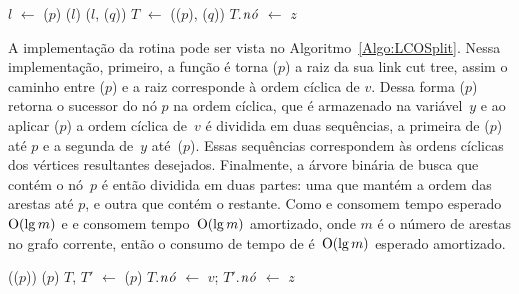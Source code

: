 \begin{algorithm}[htb]
\caption{\LCOMerge($p$, $q$, $z$)}
\label{Algo:LCOMerge}
\begin{algorithmic}[1]
\State $l$ $\gets$ \treapLast($p$)
\State \linkcutEvert($l$)
\State \linkcutAddEdge($l$, \treapFirst($q$))
\State $T$ $\gets$ \treapJoin(\treapGetRoot($p$), \treapGetRoot($q$))
\State $T$.$\mathit{n\acute{o}}$ $\gets$ $z$
\end{algorithmic}
\end{algorithm}

A implementação da rotina \LCOSplit{} pode ser vista no Algoritmo~\ref{Algo:LCOSplit}.
Nessa implementação, primeiro, a função \linkcutEvert{} é torna \treapLast($p$) a raiz da sua link cut tree, assim o caminho entre \treapFirst($p$) e a raiz corresponde à ordem cíclica de $v$.
Dessa forma \linkcutParent($p$) retorna o sucessor do nó $p$ na ordem cíclica, que é armazenado na variável~$y$ e ao aplicar \linkcutDelEdge($p$) a ordem cíclica de~$v$ é dividida em duas sequências, a primeira de \treapFirst($p$) até $p$ e a segunda de~$y$ até~\treapLast($p$).
Essas sequências correspondem às ordens cíclicas dos vértices resultantes desejados.
Finalmente, a árvore binária de busca que contém o nó~$p$ é então dividida em duas partes: uma que mantém a ordem das arestas até $p$, e outra que contém o restante.
Como \treapLast{} e \treapSplitRight{} consomem tempo esperado~$\mathrm{O}(\lg m)$ e \linkcutEvert{} e \linkcutDelEdge{} consomem tempo~$\mathrm{O}(\lg m)$ amortizado, onde $m$ é o número de arestas no grafo corrente, então o consumo de tempo de \LCOSplit{} é~$\mathrm{O}(\lg m)$ esperado amortizado.

\begin{algorithm}[htb]
\caption{\LCOSplit($p$, $v$, $z$)}
\label{Algo:LCOSplit}
\begin{algorithmic}[1]
\State \linkcutEvert(\treapLast($p$))
\State \linkcutDelEdge($p$)
\State $T$, $T'$ $\gets$ \treapSplitRight($p$)
\State $T$.$\mathit{n\acute{o}}$ $\gets$ $v$; $T'$.$\mathit{n\acute{o}}$ $\gets$ $z$
\end{algorithmic}
\end{algorithm}


